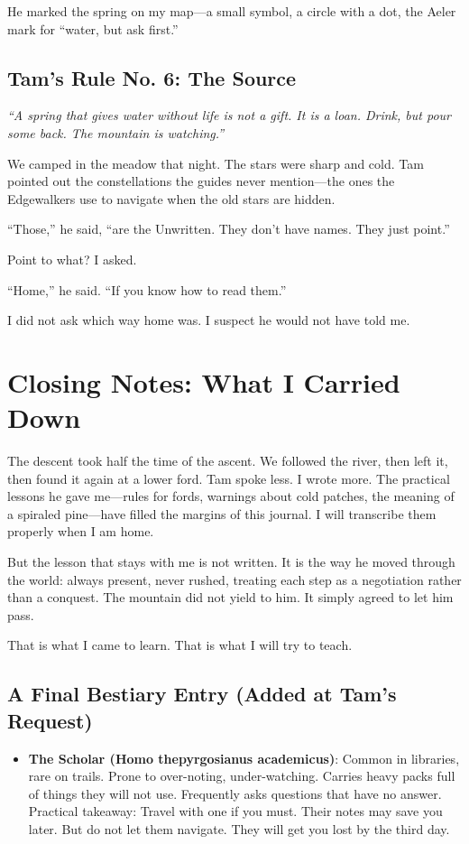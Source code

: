 \documentclass[11pt]{article}
\begin{document}
He marked the spring on my map---a small symbol, a circle with a dot, the Aeler mark for ``water, but ask first.''

\subsection*{Tam's Rule No. 6: The Source}
\textit{``A spring that gives water without life is not a gift. It is a loan. Drink, but pour some back. The mountain is watching.''}

We camped in the meadow that night. The stars were sharp and cold. Tam pointed out the constellations the guides never mention---the ones the Edgewalkers use to navigate when the old stars are hidden.

``Those,'' he said, ``are the Unwritten. They don't have names. They just point.''

Point to what? I asked.

``Home,'' he said. ``If you know how to read them.''

I did not ask which way home was. I suspect he would not have told me.

\section*{Closing Notes: What I Carried Down}
The descent took half the time of the ascent. We followed the river, then left it, then found it again at a lower ford. Tam spoke less. I wrote more. The practical lessons he gave me---rules for fords, warnings about cold patches, the meaning of a spiraled pine---have filled the margins of this journal. I will transcribe them properly when I am home.

But the lesson that stays with me is not written. It is the way he moved through the world: always present, never rushed, treating each step as a negotiation rather than a conquest. The mountain did not yield to him. It simply agreed to let him pass.

That is what I came to learn. That is what I will try to teach.

\subsection*{A Final Bestiary Entry (Added at Tam's Request)}
\begin{itemize}
    \item \textbf{The Scholar (Homo thepyrgosianus academicus)}: Common in libraries, rare on trails. Prone to over-noting, under-watching. Carries heavy packs full of things they will not use. Frequently asks questions that have no answer. Practical takeaway: Travel with one if you must. Their notes may save you later. But do not let them navigate. They will get you lost by the third day.
\end{itemize}
\end{document}
